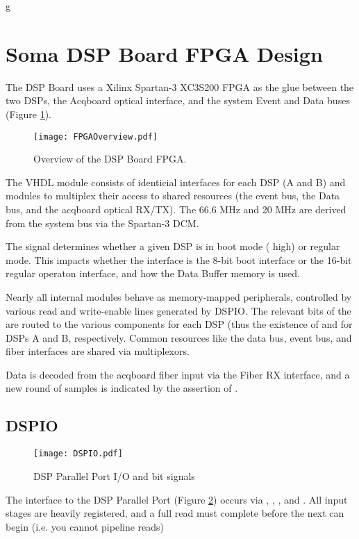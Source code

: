 g

\section{Soma DSP Board FPGA Design}


The DSP Board uses a Xilinx Spartan-3 XC3S200 FPGA as the glue between
the two DSPs, the Acqboard optical interface, and the system Event and
Data buses (Figure \ref{DSPboard.FPGA}).
  
\begin{figure}
\texttt{[image: FPGAOverview.pdf]}
\caption{Overview of the DSP Board FPGA.}
\label{DSPboard.FPGA}
\end{figure}
  
The VHDL module consists of identicial interfaces for each DSP (A and
B) and modules to multiplex their access to shared resources (the
event bus, the Data bus, and the acqboard optical RX/TX). The 66.6 MHz
 and 20 MHz  are derived from the system
bus  via the Spartan-3 DCM.


The  signal determines whether a given DSP is in boot
mode ( high) or regular mode. This impacts whether the
interface is the 8-bit boot interface or the 16-bit regular operaton
interface, and how the Data Buffer memory is used.
  
Nearly all internal modules behave as memory-mapped peripherals,
controlled by various read and write-enable lines generated by DSPIO.
The relevant bits of the  are routed to the various
components for each DSP (thus the existence of 
and  for DSPs A and B, respectively. Common
resources like the data bus, event bus, and fiber interfaces are
shared via multiplexors.
  
Data is decoded from the acqboard fiber input via the Fiber RX
interface, and a new round of samples is indicated by the assertion of
.

\subsection{DSPIO}

\begin{figure}[h]
\texttt{[image: DSPIO.pdf]}
\caption{DSP Parallel Port I/O and bit signals}
\label{DSPIO}
\end{figure}

The interface to the DSP Parallel Port (Figure \ref{DSPIO}) occurs via
, , , and . All
input stages are heavily registered, and a full read must complete
before the next can begin (i.e. you cannot pipeline reads)


